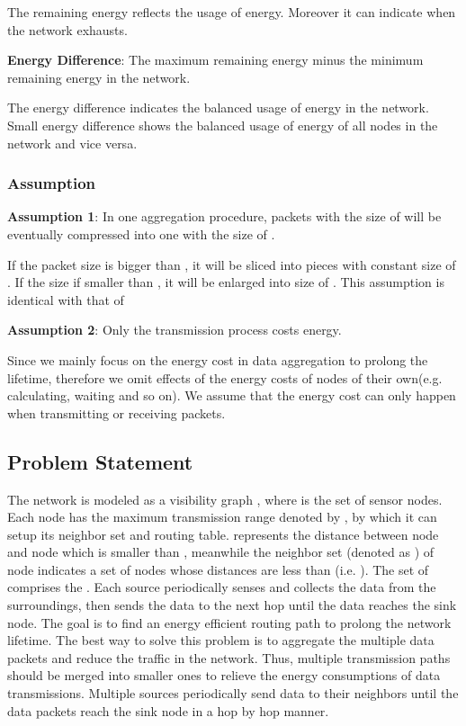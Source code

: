 \documentclass{elsarticle}
\begin{document}
The remaining energy reflects the usage of energy. Moreover it can indicate when the network exhausts.

\textbf{Energy Difference}: The maximum remaining energy minus the minimum remaining energy in the network.

The energy difference indicates the balanced usage of energy in the network. Small energy difference shows the balanced usage of energy of all nodes in the network and vice versa.

\subsubsection{Assumption}

\textbf{Assumption 1}: In one aggregation procedure,  packets with the size of  will be eventually compressed into one with the size of .

If the packet size is bigger than , it will be sliced into pieces with constant size of . If the size if smaller than , it will be enlarged into size of . This assumption is identical with that of \cite{label-11}

\textbf{Assumption 2}: Only the transmission process costs energy.

Since we mainly focus on the energy cost in data aggregation to prolong the lifetime, therefore we omit effects of the energy costs of nodes of their own(e.g. calculating, waiting and so on). We assume that the energy cost can only happen when transmitting or receiving packets.

\subsection{Problem Statement} \label{ProblemStatement}
The network is modeled as a visibility graph , where  is the set of sensor nodes. Each node has the maximum transmission range denoted by , by which it can setup its neighbor set and routing table.  represents the distance between node  and node  which is smaller than , meanwhile the neighbor set (denoted as  ) of node  indicates a set of nodes whose distances are less than (i.e. ). The set of  comprises the . Each source periodically senses and collects the data from the surroundings, then sends the data to the next hop until the data reaches the sink node. The goal is to find an energy efficient routing path to prolong the network lifetime. The best way to solve this problem is to aggregate the multiple data packets and reduce the traffic in the network. Thus, multiple transmission paths should be merged into smaller ones to relieve the energy consumptions of data transmissions. Multiple sources periodically send data to their neighbors until the data packets reach the sink node in a hop by hop manner.
\end{document}
